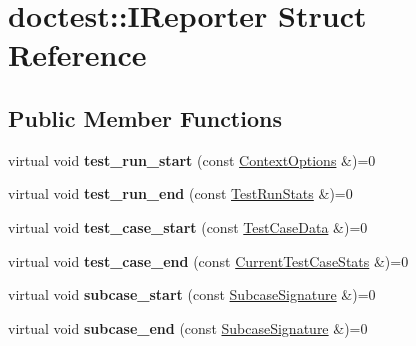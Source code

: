 \hypertarget{structdoctest_1_1_i_reporter}{}\section{doctest\+::I\+Reporter Struct Reference}
\label{structdoctest_1_1_i_reporter}
\subsection*{Public Member Functions}
\begin{DoxyCompactItemize}
\item 
\mbox{\label{structdoctest_1_1_i_reporter_a1335d45ff5d6f4243ec0bcae9e5e5d18}} 
virtual void {\bfseries test\+\_\+run\+\_\+start} (const \mbox{\hyperlink{structdoctest_1_1_context_options}{Context\+Options}} \&)=0
\item 
\mbox{\label{structdoctest_1_1_i_reporter_a610495b7caa29e36b5ea62bff62952ed}} 
virtual void {\bfseries test\+\_\+run\+\_\+end} (const \mbox{\hyperlink{structdoctest_1_1_test_run_stats}{Test\+Run\+Stats}} \&)=0
\item 
\mbox{\label{structdoctest_1_1_i_reporter_afa107df2d0230607e2f86f1876f48526}} 
virtual void {\bfseries test\+\_\+case\+\_\+start} (const \mbox{\hyperlink{structdoctest_1_1_test_case_data}{Test\+Case\+Data}} \&)=0
\item 
\mbox{\label{structdoctest_1_1_i_reporter_a43f8f19681dd5d42218ecb4fd935cda7}} 
virtual void {\bfseries test\+\_\+case\+\_\+end} (const \mbox{\hyperlink{structdoctest_1_1_current_test_case_stats}{Current\+Test\+Case\+Stats}} \&)=0
\item 
\mbox{\label{structdoctest_1_1_i_reporter_a03ef82d6fb9afe8b0e3bbe24f28dd268}} 
virtual void {\bfseries subcase\+\_\+start} (const \mbox{\hyperlink{structdoctest_1_1_subcase_signature}{Subcase\+Signature}} \&)=0
\item 
\mbox{\label{structdoctest_1_1_i_reporter_a8c06ebca73ea84a95de85da757de243c}} 
virtual void {\bfseries subcase\+\_\+end} (const \mbox{\hyperlink{structdoctest_1_1_subcase_signature}{Subcase\+Signature}} \&)=0

\end{DoxyCompactItemize}
